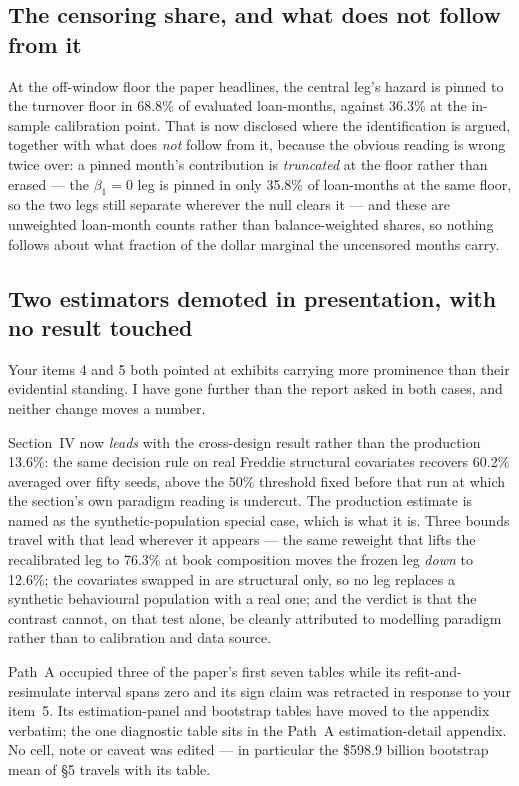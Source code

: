 \documentclass[11pt]{article}
\begin{document}
\subsection{The censoring share, and what does not follow from it}

At the off-window floor the paper headlines, the central leg's hazard is pinned to the
turnover floor in 68.8\% of evaluated loan-months, against 36.3\% at the in-sample
calibration point. That is now disclosed where the identification is argued, together
with what does \emph{not} follow from it, because the obvious reading is wrong twice
over: a pinned month's contribution is \emph{truncated} at the floor rather than
erased --- the $\beta_1 = 0$ leg is pinned in only 35.8\% of loan-months at the same
floor, so the two legs still separate wherever the null clears it --- and these are
unweighted loan-month counts rather than balance-weighted shares, so nothing follows
about what fraction of the dollar marginal the uncensored months carry.

\subsection{Two estimators demoted in presentation, with no result touched}

Your items 4 and 5 both pointed at exhibits carrying more prominence than their
evidential standing. I have gone further than the report asked in both cases, and
neither change moves a number.

Section~IV now \emph{leads} with the cross-design result rather than the production
13.6\%: the same decision rule on real Freddie structural covariates recovers 60.2\%
averaged over fifty seeds, above the 50\% threshold fixed before that run at which the
section's own paradigm reading is undercut. The production estimate is named as the
synthetic-population special case, which is what it is. Three bounds travel with that
lead wherever it appears --- the same reweight that lifts the recalibrated leg to
76.3\% at book composition moves the frozen leg \emph{down} to 12.6\%; the covariates
swapped in are structural only, so no leg replaces a synthetic behavioural population
with a real one; and the verdict is that the contrast cannot, on that test alone, be
cleanly attributed to modelling paradigm rather than to calibration and data source.

Path~A occupied three of the paper's first seven tables while its refit-and-resimulate
interval spans zero and its sign claim was retracted in response to your item~5. Its
estimation-panel and bootstrap tables have moved to the appendix verbatim; the one
diagnostic table sits in the Path~A estimation-detail appendix. No cell, note or caveat was edited --- in
particular the \$598.9 billion bootstrap mean of \S5 travels with its table.
\end{document}
